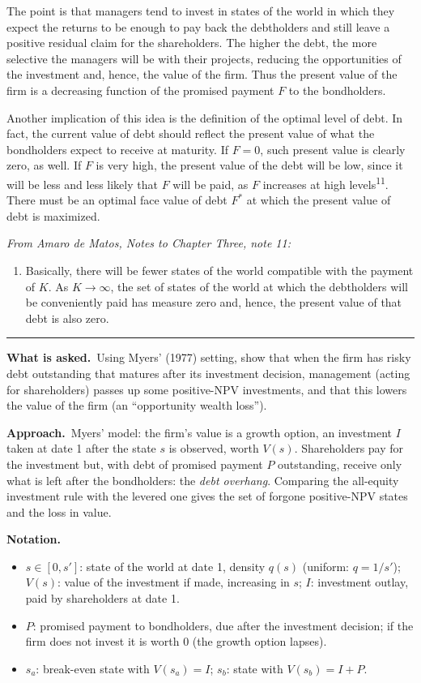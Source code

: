 \documentclass[11pt,a4paper]{article}
\newcommand{\notation}{\par\noindent\textbf{Notation.}}
\newcommand{\asked}{\par\medskip\noindent\textbf{What is asked.}~}
\newcommand{\approach}{\par\smallskip\noindent\textbf{Approach.}~}
\providecommand{\tightlist}{\setlength{\itemsep}{0pt}\setlength{\parskip}{0pt}}
\newcommand{\stmtend}{\par\endgroup\nopagebreak\noindent\rule{\linewidth}{0.4pt}\par\medskip}
\begin{document}
The point is that managers tend to invest in states of the world in which they expect the returns to
be enough to pay back the debtholders and still leave a positive residual claim for the
shareholders. The higher the debt, the more selective the managers will be with their projects,
reducing the opportunities of the investment and, hence, the value of the firm. Thus the present
value of the firm is a decreasing function of the promised payment \(F\) to the bondholders.

Another implication of this idea is the definition of the optimal level of debt. In fact, the
current value of debt should reflect the present value of what the bondholders expect to receive at
maturity. If \(F = 0\), such present value is clearly zero, as well. If \(F\) is very high, the
present value of the debt will be low, since it will be less and less likely that \(F\) will be
paid, as \(F\) increases at high levels\textsuperscript{11}. There must be an optimal face value of
debt \(F^*\) at which the present value of debt is maximized.

\emph{From Amaro de Matos, Notes to Chapter Three, note 11:}

\begin{enumerate}
\def\labelenumi{\arabic{enumi}.}
\setcounter{enumi}{10}
\tightlist
\item
  Basically, there will be fewer states of the world compatible with the payment of \(K\). As
  \(K \to \infty\), the set of states of the world at which the debtholders will be conveniently
  paid has measure zero and, hence, the present value of that debt is also zero.
\end{enumerate}
\stmtend

\asked Using Myers' (1977) setting, show that when the firm has risky debt outstanding that matures after its investment decision, management (acting for shareholders) passes up some positive-NPV investments, and that this lowers the value of the firm (an ``opportunity wealth loss'').

\approach Myers' model: the firm's value is a growth option, an investment $I$ taken at date 1 after the state $s$ is observed, worth $V(s)$. Shareholders pay for the investment but, with debt of promised payment $P$ outstanding, receive only what is left after the bondholders: the \emph{debt overhang}. Comparing the all-equity investment rule with the levered one gives the set of forgone positive-NPV states and the loss in value.

\notation
\begin{itemize}
  \item $s\in[0,s']$: state of the world at date 1, density $q(s)$ (uniform: $q=1/s'$); $V(s)$: value of the investment if made, increasing in $s$; $I$: investment outlay, paid by shareholders at date 1.
  \item $P$: promised payment to bondholders, due after the investment decision; if the firm does not invest it is worth 0 (the growth option lapses).
  \item $s_a$: break-even state with $V(s_a)=I$; $s_b$: state with $V(s_b)=I+P$.
\end{itemize}
\end{document}
